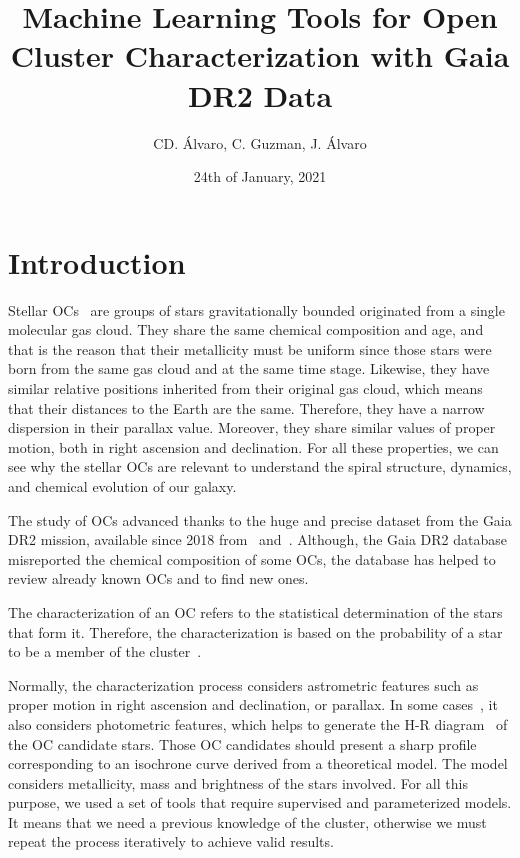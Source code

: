 \documentclass[11pt,a4paper,english,twocolumn]{article}
\title{Machine Learning Tools for Open Cluster Characterization with Gaia DR2 Data}
\author{CD. Álvaro, C. Guzman, J. Álvaro}
\date{24th of January, 2021}
\begin{document}
\twocolumn[
\begin{@twocolumnfalse}
\maketitle
\end{@twocolumnfalse}
]




\section{Introduction}

Stellar OCs~\cite{janes1982open} are groups of stars gravitationally
bounded originated from a single molecular gas cloud.
They share the same chemical composition and age, and that is the reason
that their metallicity must be uniform since those stars were born from
the same gas cloud and at the same time stage. Likewise, they have similar
relative positions inherited from their original gas cloud, which means that
their distances to the Earth are the same. Therefore, they have a narrow
dispersion in their parallax value. Moreover, they share similar values
of proper motion, both in right ascension and declination. For all these
properties, we can see why the stellar OCs are relevant to understand the
spiral structure, dynamics, and chemical evolution of our galaxy.

The study of OCs advanced thanks to the huge and precise dataset
from the Gaia DR2 mission, available since 2018 from~\cite{collaboration2016description}
and~\cite{gaia2018gaia}. Although, the Gaia DR2 database misreported the chemical
composition of some OCs, the database has helped to review already known OCs and
to find new ones.

The characterization of an OC refers to the statistical determination
of the stars that form it. Therefore, the characterization is based on
the probability of a star to be a member of the cluster~\cite{sampedro2016caracterizacion}.

Normally, the characterization process considers astrometric features such as
proper motion in right ascension and declination, or parallax.
In some cases~\cite{oliveira2013fitting}, it also considers photometric features,
which helps to generate the H-R diagram~\cite{hypki2018gaia} of the OC candidate stars.
Those OC candidates should present a sharp profile corresponding to an isochrone curve
derived from a theoretical model. The model considers metallicity, mass and brightness
of the stars involved. For all this purpose, we used a set of tools that require
supervised and parameterized models. It means that we need a previous knowledge of the
cluster, otherwise we must repeat the process iteratively to achieve valid results.
\end{document}
